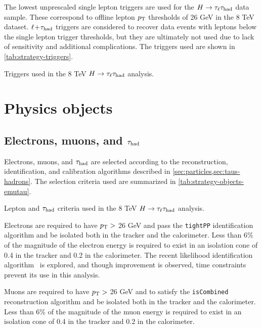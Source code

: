 The lowest unprescaled single lepton triggers are used for the $H\rightarrow\tau_\ell\tau_\text{had}$ data sample. These correspond to offline lepton $p_{\mathrm{T}}$ thresholds of 26 GeV in the 8 TeV dataset. $\ell\!+\!\tau_\text{had}$ triggers are considered to recover data events with leptons below the single lepton trigger thresholds, but they are ultimately not used due to lack of sensitivity and additional complications. The triggers used are shown in \cref{tab:strategy-triggers}.

\begin{table}[bp]
  \centering
  \renewcommand{\arraystretch}{1.4}
  \caption{Triggers used in the 8 TeV $H\rightarrow\tau_\ell\tau_\text{had}$ analysis.}
  
  \label{tab:strategy-triggers}
\end{table}

\section{Physics objects}
\label{sec:strategy-objects}

\subsection{Electrons, muons, and $\tau_\text{had}$}
\label{sec:strategy-leptons}

Electrons, muons, and $\tau_\text{had}$ are selected according to the reconstruction, identification, and calibration algorithms described in \cref{sec:particles,sec:taus-hadrons}. The selection criteria used are summarized in \cref{tab:strategy-objects-emutau}.

\begin{table}[bp]
  \centering
  \renewcommand{\arraystretch}{1.4}
  \caption{Lepton and $\tau_\text{had}$ criteria used in the 8 TeV $H\rightarrow\tau_\ell\tau_\text{had}$ analysis.}
  
  \label{tab:strategy-objects-emutau}
\end{table}

Electrons are required to have $p_{\mathrm{T}} >$ 26 GeV and pass the \texttt{tightPP} identification algorithm and be isolated both in the tracker and the calorimeter. Less than 6\% of the magnitude of the electron energy is required to exist in an isolation cone of 0.4 in the tracker and 0.2 in the calorimeter. The recent likelihood identification algorithm~\cite{ATLAS-CONF-2014-032} is explored, and though improvement is observed, time constraints prevent its use in this analysis.

Muons are required to have $p_{\mathrm{T}} >$ 26 GeV and to satisfy the \texttt{isCombined} reconstruction algorithm and be isolated both in the tracker and the calorimeter. Less than 6\% of the magnitude of the muon energy is required to exist in an isolation cone of 0.4 in the tracker and 0.2 in the calorimeter.

